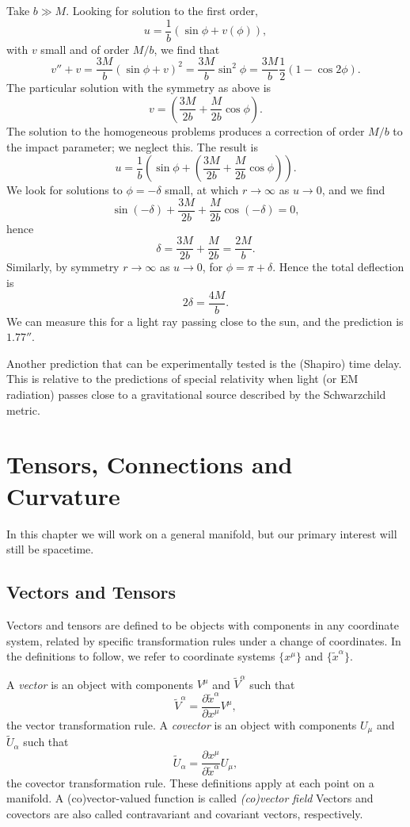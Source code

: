 \documentclass[12pt]{article}
\begin{document}
Take $b \gg M$. Looking for solution to the first order,
\[
u = \frac{1}{b}(\sin \phi + v(\phi)),
\]
with $v$ small and of order $M/b$, we find that
\[
v'' + v = \frac{3M}{b}(\sin \phi + v)^2 = \frac{3M}{b} \sin^2 \phi = \frac{3M}{b} \frac{1}{2}(1 - \cos 2 \phi).
\]
The particular solution with the symmetry as above is
\[
v = \left( \frac{3M}{2b} + \frac{M}{2b} \cos \phi \right).
\]
The solution to the homogeneous problems produces a correction of order $M/b$ to the impact parameter; we neglect this. The result is
\[
u = \frac{1}{b} \left( \sin \phi + \left( \frac{3M}{2b} + \frac{M}{2b} \cos \phi \right) \right).
\]
We look for solutions to $\phi = -\delta$ small, at which $r \to \infty$ as $u \to 0$, and we find
\[
\sin(- \delta) + \frac{3M}{2b} + \frac{M}{2b} \cos(-\delta) = 0,
\]
hence
\[
\delta = \frac{3M}{2b} + \frac{M}{2b} = \frac{2M}{b}.
\]
Similarly, by symmetry $r \to \infty$ as $u \to 0$, for $\phi = \pi + \delta$. Hence the total deflection is
\[
2 \delta = \frac{4M}{b}.
\]
We can measure this for a light ray passing close to the sun, and the prediction is $\ang{;;1.77}$.

Another prediction that can be experimentally tested is the (Shapiro) time delay. This is relative to the predictions of special relativity when light (or EM radiation) passes close to a gravitational source described by the Schwarzchild metric.


\newpage

\section{Tensors, Connections and Curvature}
\label{sec:tcc}

In this chapter we will work on a general manifold, but our primary interest will still be spacetime.

\subsection{Vectors and Tensors}
\label{sub:vt}

Vectors and tensors are defined to be objects with components in any coordinate system, related by specific transformation rules under a change of coordinates. In the definitions to follow, we refer to coordinate systems $\{x^\mu\}$ and $\{\tilde x^\alpha\}$.

A \emph{vector} is an object with components $V^\mu$ and $\tilde V^\alpha$ such that
\[
\tilde V^\alpha = \frac{\partial \tilde x^\alpha}{\partial x^\mu} V^\mu,
\]
the vector transformation rule. A \emph{covector} is an object with components $U_\mu$ and $\tilde U_\alpha$ such that
\[
\tilde U_\alpha = \frac{\partial x^\mu}{\partial \tilde x^\alpha} U_\mu,
\]
the covector transformation rule. These definitions apply at each point on a manifold. A (co)vector-valued function is called \emph{(co)vector field} Vectors and covectors are also called contravariant and covariant vectors, respectively.
\end{document}
